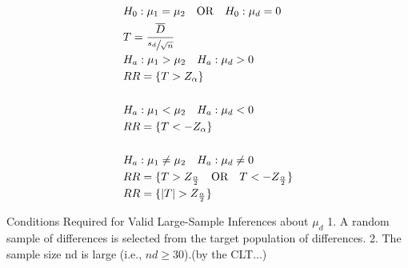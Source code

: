 \documentclass[fontsize=6pt, paper=a4]{scrartcl}
\begin{document}
\begin{multicols*}{4}
{\begin{align}
	&H_0:\mu_1=\mu_2 \quad \textrm{OR} \quad H_0:\mu_d=0\\ 
	&T=\frac{\overline{D}}{\sfrac{s_d}{\sqrt{n}}}\\
	&H_a:\mu_1>\mu_2 \quad H_a:\mu_d>0\\
	&RR= \{ T> Z_\alpha \}\\ \\
	&H_a:\mu_1<\mu_2 \quad H_a:\mu_d<0\\
	&RR= \{ T< -Z_\alpha \}\\ \\
	&H_a:\mu_1\neq \mu_2 \quad H_a:\mu_d\neq 0\\
	&RR= \{ T> Z_{\frac{\alpha}{2}} \quad \textrm{OR} \quad T<- Z_{\frac{\alpha}{2}} \} \\
	&RR= \{ \left|T\right|> Z_{\frac{\alpha}{2}}\}
\end{align}


Conditions Required for Valid Large-Sample Inferences about $\mu_d$
1. A random sample of differences is selected from the target population of
differences.
2. The sample size nd is large (i.e., $nd \geq 30$).(by the CLT...)

}
\end{multicols*}
\end{document}

